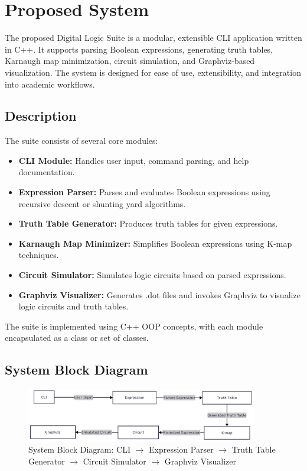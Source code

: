 \section{Proposed System}
The proposed Digital Logic Suite is a modular, extensible CLI application written in C++. It supports parsing Boolean expressions, generating truth tables, Karnaugh map minimization, circuit simulation, and Graphviz-based visualization. The system is designed for ease of use, extensibility, and integration into academic workflows.

\subsection{Description}
The suite consists of several core modules:
\begin{itemize}
    \item \textbf{CLI Module:} Handles user input, command parsing, and help documentation.
    \item \textbf{Expression Parser:} Parses and evaluates Boolean expressions using recursive descent or shunting yard algorithms.
    \item \textbf{Truth Table Generator:} Produces truth tables for given expressions.
    \item \textbf{Karnaugh Map Minimizer:} Simplifies Boolean expressions using K-map techniques.
    \item \textbf{Circuit Simulator:} Simulates logic circuits based on parsed expressions.
    \item \textbf{Graphviz Visualizer:} Generates .dot files and invokes Graphviz to visualize logic circuits and truth tables.
\end{itemize}
The suite is implemented using C++ OOP concepts, with each module encapsulated as a class or set of classes.


\subsection{System Block Diagram}
\begin{figure}[ht!]
    \centering
    \includegraphics[width=0.9\textwidth]{images/inverted_C.png}
    \caption{System Block Diagram: CLI $\rightarrow$ Expression Parser $\rightarrow$ Truth Table Generator $\rightarrow$ Circuit Simulator $\rightarrow$ Graphviz Visualizer}
    \label{fig:system_block_diagram}
\end{figure}